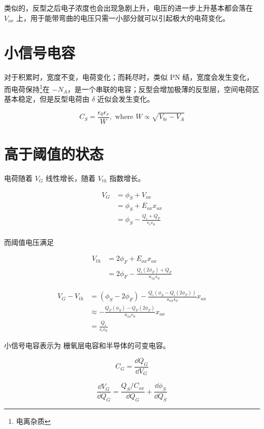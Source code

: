\documentclass[cn,11pt,chinese,black,simple]{../elegantbook}
\begin{document}
类似的，反型之后电子浓度也会出现急剧上升，电压的进一步上升基本都会落在 \(V_{ox}\) 上，用于能带弯曲的电压只需一小部分就可以引起极大的电荷变化。

\section{小信号电容}

对于积累时，宽度不变，电荷变化；而耗尽时，类似 PN 结，宽度会发生变化，而电荷保持\footnote{电离杂质}在 \(-N_A\)，是一个串联的电容；反型会增加极薄的反型层，空间电荷区基本稳定，但是反型电荷由 \(\delta\) 近似会发生变化。

\[C_S = \frac{\epsilon_0 \epsilon_r}{W}, \text{ where } W \propto \sqrt{V_{bi} - V_A} \]

\section{高于阈值的状态}

电荷随着 \(V_G\) 线性增长，随着 \(V_{th}\) 指数增长。

\[\begin{aligned}
    V_G &= \phi_S + V_{ox}\\
    &= \phi_S + E_{ox} x_{ox} \\
    &= \phi_S - \frac{Q_i + Q_F}{\epsilon_r \epsilon_0} \\
\end{aligned}\]

而阈值电压满足

\[\begin{aligned}
    V_{th} &= 2 \phi_F + E_{ox} x_{ox} \\ 
    &= 2 \phi_F - \frac{Q_i(2\phi_F)+Q_F}{\kappa_{ox} \epsilon_0}
\end{aligned}\]

\[\begin{aligned}
    V_G - V_{th} &= (\phi_S - 2 \phi_F) - \frac{Q_i(\phi_S - Q_i(2 \phi_F))}{\kappa_{ox} \epsilon_0} x_{ox} \\
    &\approx - \frac{Q_F(\phi_S) - Q_F(2 \phi_F)}{\kappa_{ox} \epsilon_0} x_{ox} \\
    &= \frac{Q_i}{\epsilon_r \epsilon_0}
\end{aligned}\] 

小信号电容表示为 栅氧层电容和半导体的可变电容。

\[C_G = \frac{\dd{Q_{G}}}{\dd{V_{G}}}\]

\[\frac{\dd{V_G}}{\dd{Q_G}} = \frac{Q_S/C_{ox}}{\dd{Q_G}} + \frac{\dd{}\phi_S}{\dd{Q_S}}\]
\end{document}

